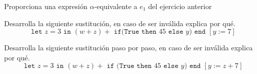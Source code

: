 \bigskip
    
    \begin{exercise}
        Proporciona una expresión $\alpha$-equivalente a $e_1$ del ejercicio anterior 
    \end{exercise}

    \bigskip
    
    
    \begin{exercise}
         Desarrolla la siguiente sustitución, en caso de ser inválida explica por qué.
         \[
         \texttt{ let } z = 3 \texttt{ in } (w + z) + \texttt{ if(} \texttt{True} \texttt{ then } 45 \texttt{ else } y \texttt{) } \texttt{end } [y:=7]
         \]
    \end{exercise}

    \bigskip
    
    \begin{exercise}
        Desarrolla la siguiente sustitución paso por paso, en caso de ser inválida explica por qué. 
        \[
            \texttt{ let } z = 3 \texttt{ in } (w + z) + \texttt{ if (} \texttt{True} \texttt{ then } 45 \texttt{ else } y \texttt{)} \texttt{ end } [y:=z+7]
        \]
    \end{exercise}

    \bigskip


